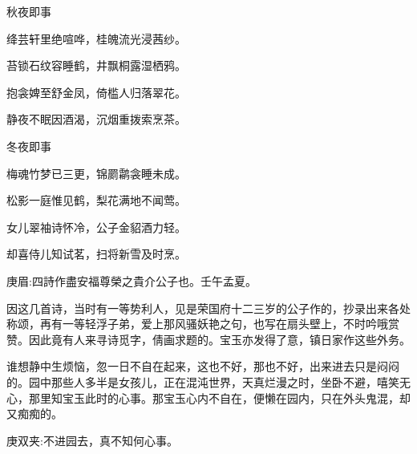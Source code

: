 \begin{poem}
    \begin{pl}秋夜即事\end{pl}

    \begin{pl}绛芸轩里绝喧哗，桂魄流光浸茜纱。\end{pl}

    \begin{pl}苔锁石纹容睡鹤，井飘桐露湿栖鸦。\end{pl}

    \begin{pl}抱衾婢至舒金凤，倚槛人归落翠花。\end{pl}

    \begin{pl}静夜不眠因酒渴，沉烟重拨索烹茶。\end{pl}

\end{poem}


\begin{poem}
    \begin{pl}冬夜即事\end{pl}

    \begin{pl}梅魂竹梦已三更，锦罽鹴衾睡未成。\end{pl}

    \begin{pl}松影一庭惟见鹤，梨花满地不闻莺。\end{pl}

    \begin{pl}女儿翠袖诗怀冷，公子金貂酒力轻。\end{pl}

    \begin{pl}却喜侍儿知试茗，扫将新雪及时烹。\end{pl}\begin{note}庚眉:四詩作盡安福尊榮之貴介公子也。壬午孟夏。\end{note}
\end{poem}


\begin{parag}
    因这几首诗，当时有一等势利人，见是荣国府十二三岁的公子作的，抄录出来各处称颂，再有一等轻浮子弟，爱上那风骚妖艳之句，也写在扇头壁上，不时吟哦赏赞。因此竟有人来寻诗觅字，倩画求题的。宝玉亦发得了意，镇日家作这些外务。
\end{parag}


\begin{parag}
    谁想静中生烦恼，忽一日不自在起来，这也不好，那也不好，出来进去只是闷闷的。园中那些人多半是女孩儿，正在混沌世界，天真烂漫之时，坐卧不避，嘻笑无心，那里知宝玉此时的心事。那宝玉心内不自在，便懒在园内，只在外头鬼混，却又痴痴的。\begin{note}庚双夹:不进园去，真不知何心事。\end{note}
\end{parag}


